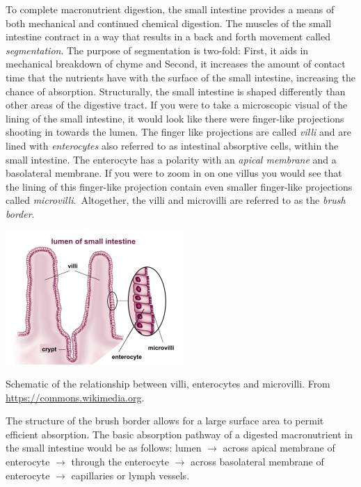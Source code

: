 \documentclass{tufte-handout}
\begin{document}
To complete macronutrient digestion, the small intestine provides a means of both mechanical and continued chemical digestion. The muscles of the small intestine contract in a way that results in a back and forth movement called \emph{segmentation}. The purpose of segmentation is two-fold: First, it aids in mechanical breakdown of chyme and Second, it increases the amount of contact time that the nutrients have with the surface of the small intestine, increasing the chance of absorption. Structurally, the small intestine is shaped differently than other areas of the digestive tract. If you were to take a microscopic visual of the lining of the small intestine, it would look like there were finger-like projections shooting in towards the lumen. The finger like projections are called \emph{villi} and are lined with \emph{enterocytes} also referred to as intestinal absorptive cells, within the small intestine. The enterocyte has a polarity with an \emph{apical membrane} and a basolateral membrane. If you were to zoom in on one villus you would see that the lining of this finger-like projection contain even smaller finger-like projections called \emph{microvilli}.\ Altogether, the villi and microvilli are referred to as the \emph{brush border}.

\begin{marginfigure}
\includegraphics{figures/enterocyte-villi.png}
\caption{Schematic of the relationship between villi, enterocytes and microvilli.  From \url{https://commons.wikimedia.org}.}
\end{marginfigure}

The structure of the brush border allows for a large surface area to permit efficient absorption. The basic absorption pathway of a digested macronutrient in the small intestine would be as follows: lumen $\rightarrow$ across apical membrane of enterocyte $\rightarrow$ through the enterocyte $\rightarrow$ across basolateral membrane of enterocyte $\rightarrow$ capillaries or lymph vessels.\  
\end{document}
